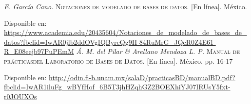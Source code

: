 \begin{thebibliography}{}
	\textit{E. García Cano.}
	\textsc{Notaciones de modelado de bases de datos.} [En línea]. México.
	
	Disponible en:
	\url{https://www.academia.edu/20435604/Notaciones_de_modelado_de_bases_de_datos?fbclid=IwAR0jlb2ddOVgIQByreQg9H-84RuMrG_JQeR0Z4E61-R_E08eejb97PuPEmM}
	\textit{Á. M. del Pilar \& Arellano Mendoza L. P.}
	\textsc{Manual de prácticasdel Laboratorio de Bases de Datos.} [En línea]. México. pp. 16-17
	
	Disponible en: 
	\url{http://odin.fi-b.unam.mx/salaD/practicasBD/manualBD.pdf?fbclid=IwAR1iluFg_wBYfHof_6B5T3jhHZqhGZ2BOEXhiYJ07IRUsY5fxt-r0JOUXOs}	
	
	
	
	
\end{thebibliography}
